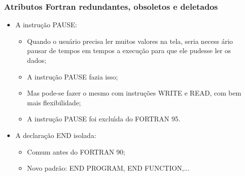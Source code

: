 \documentclass[xcolor=table]{beamer}
\newenvironment{stepitemize}{\begin{itemize}[<+->]}{\end{itemize} }
\begin{document}
\begin{frame}%

\frametitle{Atributos Fortran redundantes, obsoletos e deletados}

\begin{stepitemize}
\item A instru\c{c}\~{a}o PAUSE:

\begin{itemize}
\item Quando o usu\'{a}rio precisa ler muitos valores na tela, seria necess%
\'{a}rio pausar de tempos em tempos a execu\c{c}\~{a}o para que ele pudesse
ler os dados;

\item A instru\c{c}\~{a}o PAUSE fazia isso;

\item Mas pode-se fazer o mesmo com instru\c{c}\~{o}es WRITE e READ, com bem
mais flexibilidade;

\item A instru\c{c}\~{a}o PAUSE foi exclu\'{\i}da do FORTRAN 95.
\end{itemize}

\item A declara\c{c}\~{a}o END isolada:

\begin{itemize}
\item Comum antes do FORTRAN 90;

\item Novo padr\~{a}o: END PROGRAM, END FUNCTION,...
\end{itemize}
\end{stepitemize}

\transboxout%
\end{frame}%
\end{document}
